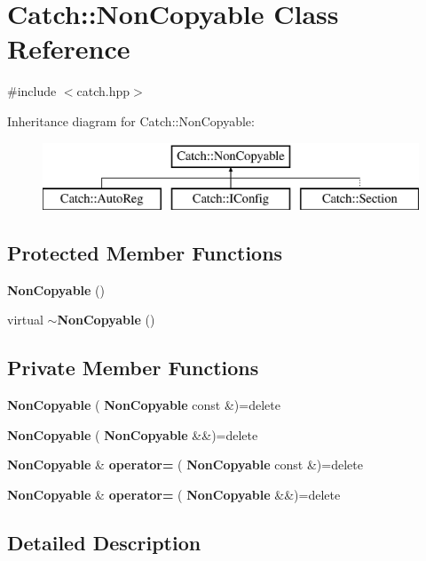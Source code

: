 \section{Catch\+::Non\+Copyable Class Reference}
\label{class_catch_1_1_non_copyable}


{\ttfamily \#include $<$catch.\+hpp$>$}

Inheritance diagram for Catch\+::Non\+Copyable\+:\begin{figure}[H]
\begin{center}
\leavevmode
\includegraphics[height=2.000000cm]{class_catch_1_1_non_copyable}
\end{center}
\end{figure}
\subsection*{Protected Member Functions}
\begin{DoxyCompactItemize}
\item 
\textbf{ Non\+Copyable} ()
\item 
virtual \textbf{ $\sim$\+Non\+Copyable} ()
\end{DoxyCompactItemize}
\subsection*{Private Member Functions}
\begin{DoxyCompactItemize}
\item 
\textbf{ Non\+Copyable} (\textbf{ Non\+Copyable} const \&)=delete
\item 
\textbf{ Non\+Copyable} (\textbf{ Non\+Copyable} \&\&)=delete
\item 
\textbf{ Non\+Copyable} \& \textbf{ operator=} (\textbf{ Non\+Copyable} const \&)=delete
\item 
\textbf{ Non\+Copyable} \& \textbf{ operator=} (\textbf{ Non\+Copyable} \&\&)=delete
\end{DoxyCompactItemize}


\subsection{Detailed Description}


